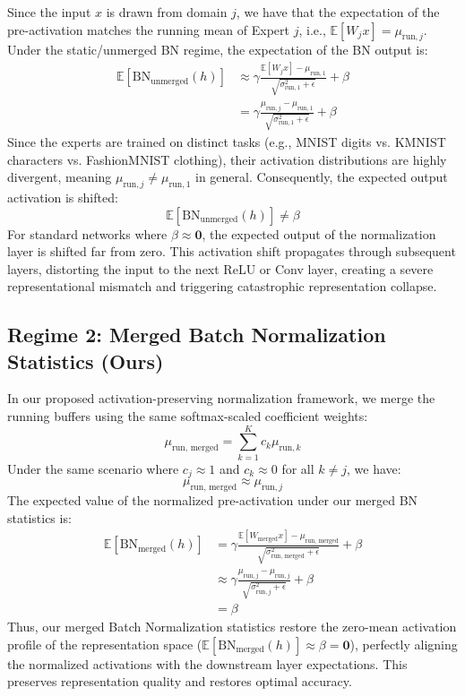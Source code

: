 \documentclass{article}
\theoremstyle{plain}
\theoremstyle{definition}
\theoremstyle{remark}
\begin{document}
Since the input $x$ is drawn from domain $j$, we have that the expectation of the pre-activation matches the running mean of Expert $j$, i.e., $\mathbb{E}[W_j x] = \mu_{\text{run}, j}$. Under the static/unmerged BN regime, the expectation of the BN output is:
\begin{align}
    \mathbb{E}[\text{BN}_{\text{unmerged}}(h)] &\approx \gamma \frac{\mathbb{E}[W_j x] - \mu_{\text{run}, 1}}{\sqrt{\sigma^2_{\text{run}, 1} + \epsilon}} + \beta \\
    &= \gamma \frac{\mu_{\text{run}, j} - \mu_{\text{run}, 1}}{\sqrt{\sigma^2_{\text{run}, 1} + \epsilon}} + \beta
\end{align}
Since the experts are trained on distinct tasks (e.g., MNIST digits vs. KMNIST characters vs. FashionMNIST clothing), their activation distributions are highly divergent, meaning $\mu_{\text{run}, j} \neq \mu_{\text{run}, 1}$ in general. Consequently, the expected output activation is shifted:
\begin{equation}
    \mathbb{E}[\text{BN}_{\text{unmerged}}(h)] \neq \beta
\end{equation}
For standard networks where $\beta \approx \mathbf{0}$, the expected output of the normalization layer is shifted far from zero. This activation shift propagates through subsequent layers, distorting the input to the next ReLU or Conv layer, creating a severe representational mismatch and triggering catastrophic representation collapse.

\subsection{Regime 2: Merged Batch Normalization Statistics (Ours)}
In our proposed activation-preserving normalization framework, we merge the running buffers using the same softmax-scaled coefficient weights:
\begin{equation}
    \mu_{\text{run, merged}} = \sum_{k=1}^K c_k \mu_{\text{run}, k}
\end{equation}
Under the same scenario where $c_j \approx 1$ and $c_k \approx 0$ for all $k \neq j$, we have:
\begin{equation}
    \mu_{\text{run, merged}} \approx \mu_{\text{run}, j}
\end{equation}
The expected value of the normalized pre-activation under our merged BN statistics is:
\begin{align}
    \mathbb{E}[\text{BN}_{\text{merged}}(h)] &= \gamma \frac{\mathbb{E}[W_{\text{merged}} x] - \mu_{\text{run, merged}}}{\sqrt{\sigma^2_{\text{run, merged}} + \epsilon}} + \beta \\
    &\approx \gamma \frac{\mu_{\text{run}, j} - \mu_{\text{run}, j}}{\sqrt{\sigma^2_{\text{run}, j} + \epsilon}} + \beta \\
    &= \beta
\end{align}
Thus, our merged Batch Normalization statistics restore the zero-mean activation profile of the representation space ($\mathbb{E}[\text{BN}_{\text{merged}}(h)] \approx \beta = \mathbf{0}$), perfectly aligning the normalized activations with the downstream layer expectations. This preserves representation quality and restores optimal accuracy.
\end{document}
